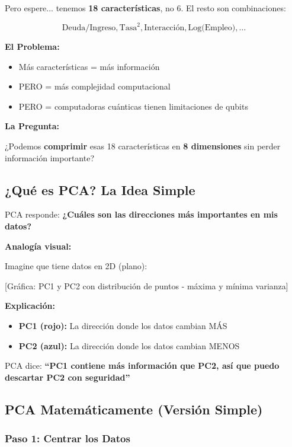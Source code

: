 \documentclass[11pt,a4paper,spanish]{article}
\begin{document}
Pero espere... tenemos \textbf{18 características}, no 6. El resto son combinaciones:

\[
\text{Deuda/Ingreso}, \text{Tasa}^2, \text{Interacción}, \text{Log(Empleo)}, \ldots
\]

\textbf{El Problema:}
\begin{itemize}
    \item Más características = más información
    \item PERO = más complejidad computacional
    \item PERO = computadoras cuánticas tienen limitaciones de qubits
\end{itemize}

\textbf{La Pregunta:}

¿Podemos \textbf{comprimir} esas 18 características en \textbf{8 dimensiones} sin perder información importante?

\subsection{¿Qué es PCA? La Idea Simple}

PCA responde: \textbf{¿Cuáles son las direcciones más importantes en mis datos?}

\textbf{Analogía visual:}

Imagine que tiene datos en 2D (plano):

[Gráfica: PC1 y PC2 con distribución de puntos - máxima y mínima varianza]

\textbf{Explicación:}

\begin{itemize}
    \item \textbf{PC1 (rojo):} La dirección donde los datos cambian MÁS
    \item \textbf{PC2 (azul):} La dirección donde los datos cambian MENOS
\end{itemize}

PCA dice: \textbf{``PC1 contiene más información que PC2, así que puedo descartar PC2 con seguridad''}

\subsection{PCA Matemáticamente (Versión Simple)}

\subsubsection{Paso 1: Centrar los Datos}
\end{document}
